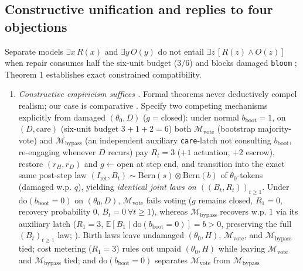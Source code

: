 \documentclass[12pt,letterpaper]{article}
\providecommand{\tightlist}{\setlength{\itemsep}{2pt}\setlength{\parskip}{0pt}}
\begin{document}
\subsection{Constructive unification and replies to four
objections}\label{constructive-unification-and-replies-to-four-objections}

Separate models \(\exists x\,R(x)\) and \(\exists y\,O(y)\) do not
entail \(\exists z\,[R(z)\land O(z)]\) when repair consumes half the
six-unit budget (\(3/6\)) and blocks damaged \texttt{bloom}
\citep{friedman1974, kitcher1989}; Theorem 1 establishes exact
constrained compatibility.

\begin{enumerate}
\def\labelenumi{\arabic{enumi}.}
\tightlist
\item
  \emph{Constructive empiricism suffices \citep{vanFraassen1980}.}
  Formal theorems never deductively compel realism; our case is
  comparative \citep{hacking1983, woodward2003}. Specify two competing
  mechanisms explicitly from damaged \((\theta_0, D)\)
  (\(g=\mathrm{closed}\)): under normal \(b_{\mathrm{boot}}=1\), on
  \((D, \mathrm{care})\) (six-unit budget \(3+1+2=6\)) both
  \(\mathcal{M}_{\mathrm{vote}}\) (bootstrap majority-vote) and
  \(\mathcal{M}_{\mathrm{bypass}}\) (an independent auxiliary
  \texttt{care}-latch not consulting \(b_{\mathrm{boot}}\), re-engaging
  whenever \(D\) recurs) pay \(R_t = 3\) (\(+1\) actuation, \(+2\)
  escrow), restore \((r_H, r_D)\) and \(g \leftarrow \mathrm{open}\) at
  step end, and transition into the exact same post-step law
  \((I_{\mathrm{ret}}, B_t) \sim \mathrm{Bern}(s)\otimes\mathrm{Bern}(b)\)
  of \(\theta_0\)-tokens (damaged w.p. \(q\)), yielding \emph{identical
  joint laws on \(((B_t, R_t))_{t\ge 1}\)}. Under
  \(\mathrm{do}(b_{\mathrm{boot}}=0)\) on \((\theta_0, D)\),
  \(\mathcal{M}_{\mathrm{vote}}\) fails voting (\(g\) remains
  \(\mathrm{closed}\), \(R_1=0\), recovery probability \(0\),
  \(B_t=0\ \forall t\ge 1\)), whereas \(\mathcal{M}_{\mathrm{bypass}}\)
  recovers w.p. \(1\) via its auxiliary latch (\(R_1=3\),
  \(\mathbb{E}[B_1 \mid \mathrm{do}(b_{\mathrm{boot}}=0)] = b > 0\),
  preserving the full \((B_t)_{t\ge 1}\) law; \citet{rubenstein2017}).
  Birth laws leave undamaged \((\theta_0, H)\),
  \(\mathcal{M}_{\mathrm{vote}}\), and \(\mathcal{M}_{\mathrm{bypass}}\)
  tied; cost metering (\(R_1=3\)) rules out unpaid \((\theta_0, H)\)
  while leaving \(\mathcal{M}_{\mathrm{vote}}\) and
  \(\mathcal{M}_{\mathrm{bypass}}\) tied; and
  \(\mathrm{do}(b_{\mathrm{boot}}=0)\) separates
  \(\mathcal{M}_{\mathrm{vote}}\) from \(\mathcal{M}_{\mathrm{bypass}}\)

\end{enumerate}
\end{document}
